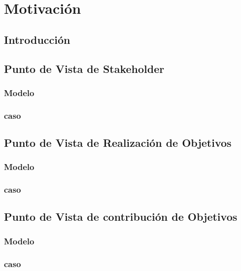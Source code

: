 \chapter{Motivación}
\section{Introducción}

\section{Punto de Vista de Stakeholder}

\subsection{Modelo}

\newpage

\subsection{caso}

\newpage

\section{Punto de Vista de Realización de Objetivos}

\subsection{Modelo}

\newpage

\subsection{caso}

\newpage

\section{Punto de Vista de contribución de Objetivos}

\subsection{Modelo}

\newpage

\subsection{caso}

